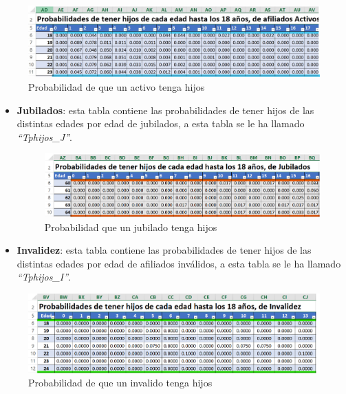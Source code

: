 \documentclass[
  letterpaper,
  DIV=11,
  numbers=noendperiod]{scrreprt}
\begin{document}
\begin{figure}

{\centering \includegraphics[width=6.5625in,height=\textheight]{images/F/Img8.jpg}

}

\caption{Probabilidad de que un activo tenga hijos}

\end{figure}

\begin{itemize}
\item
  \textbf{Jubilados}: esta tabla contiene las probabilidades de tener
  hijos de las distintas edades por edad de jubilados, a esta tabla se
  le ha llamado \emph{``Tphijos\_J''}.

  \begin{figure}

  {\centering \includegraphics[width=7.29167in,height=\textheight]{images/F/Img9.png}

  }

  \caption{Probabilidad que un jubilado tenga hijos}

  \end{figure}
\item
  \textbf{Invalidez}: esta tabla contiene las probabilidades de tener
  hijos de las distintas edades por edad de afiliados inválidos, a esta
  tabla se le ha llamado \emph{``Tphijos\_I''}.
\end{itemize}

\begin{figure}

{\centering \includegraphics[width=6.5625in,height=\textheight]{images/F/Img10.png}

}

\caption{Probabilidad de que un invalido tenga hijos}

\end{figure}
\end{document}
